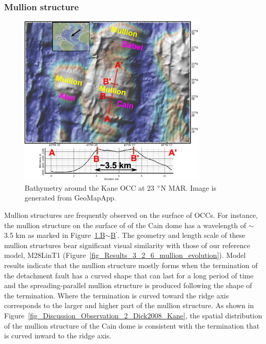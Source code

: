 \subsubsection{Mullion structure}

\begin{figure}[h]
  \centering
    \includegraphics[width=0.8\textwidth]{./Figures/fig_Discussion_Observation_5_Mullion_Kane.eps}
  \caption[Bathymetry around the Kane OCC at 23 $\degree$N MAR.]{Bathymetry around the Kane OCC at 23 $\degree$N MAR. Image is generated from GeoMapApp.}
 \label{fig_Discussion_Observation_5_Mullion_Kane}
\end{figure}   

Mullion structures are frequently observed on the surface of OCCs. For instance, the mullion structure on the surface of of the Cain dome has a wavelength of $\sim$3.5 km as marked in Figure~\hyperref[fig_Discussion_Observation_5_Mullion_Kane]{\ref{fig_Discussion_Observation_5_Mullion_Kane}.B$\sim$B$^\prime$}. The geometry and length scale of these mullion structures bear significant visual similarity with those of our reference model, M28LinT1 (Figure~\hyperref[fig_Results_3_2_6_mullion_evolution]{\ref{fig_Results_3_2_6_mullion_evolution}}). Model results indicate that the mullion structure mostly forms when the termination of the detachment fault has a curved shape that can last for a long period of time and the spreading-parallel mullion structure is produced following the shape of the termination. Where the termination is curved toward the ridge axis corresponds to the larger and higher part of the mullion structure. As shown in Figure~\hyperref[fig_Discussion_Observation_2_Dick2008_Kane]{\ref{fig_Discussion_Observation_2_Dick2008_Kane}}, the spatial distribution of the mullion structure of the Cain dome is consistent with the termination that is curved inward to the ridge axis.

